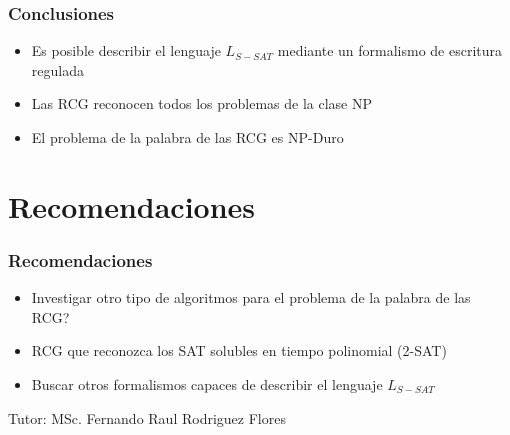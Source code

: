 \documentclass{beamer}
\newcommand{\tutor}{MSc. Fernando Raul Rodriguez Flores} %
\begin{document}
\begin{frame}
    \frametitle{Conclusiones}

    \begin{itemize}
        \item Es posible describir el lenguaje $L_{S-SAT}$ mediante un formalismo de escritura regulada
              \pause
        \item Las RCG reconocen todos los problemas de la clase NP
              \pause
        \item El problema de la palabra de las RCG es NP-Duro
    \end{itemize}
\end{frame}

\section{Recomendaciones}
\begin{frame}
    \frametitle{Recomendaciones}

    \begin{itemize}
        \item Investigar otro tipo de algoritmos para el problema de la palabra de las RCG?
              \pause
        \item RCG que reconozca los SAT solubles en tiempo polinomial (2-SAT)
              \pause
        \item Buscar otros formalismos capaces de describir el lenguaje $L_{S-SAT}$
    \end{itemize}


\end{frame}

\begin{frame}
    \titlepage
    \vspace{1cm} %
    \begin{center}
        Tutor: \tutor
    \end{center}
\end{frame}
\end{document}
